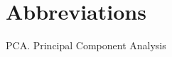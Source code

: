 \documentclass[oneside,12pt]{report}
\begin{document}
\chapter{Abbreviations}\label{Abbreviations}


\noindent PCA.  Principal Component Analysis

\vspace{5pt}

%
%
%
%
%




\renewcommand\bibname{Selected Bibliography Including Cited Works}
\nocite{*}  %

\end{document}
